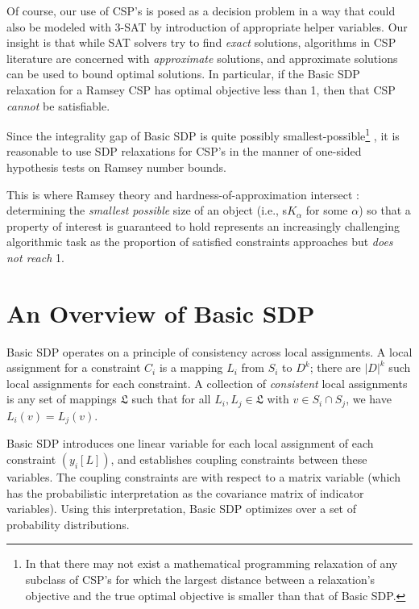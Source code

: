 \documentclass[12pt]{article} %
\begin{document}
Of course, our use of CSP's is posed as a decision problem in a way that could also be modeled with 3-SAT by introduction of appropriate helper variables. Our insight is that while SAT solvers try to find \textit{exact} solutions, algorithms in CSP literature are concerned with \textit{approximate} solutions, and approximate solutions can be used to bound optimal solutions. In particular, if the Basic SDP relaxation for a Ramsey CSP has optimal objective less than 1, then that CSP \textit{cannot} be satisfiable. 

Since the integrality gap of Basic SDP is quite possibly smallest-possible\footnote{In that there may not exist a mathematical programming relaxation of any subclass of CSP's for which the largest distance between a relaxation's objective and the true optimal objective is smaller than that of Basic SDP.} \cite{raghavendra2008optimal}, it is reasonable to use SDP relaxations for CSP's in the manner of one-sided hypothesis tests on Ramsey number bounds. 

This is where Ramsey theory and hardness-of-approximation intersect : determining the \textit{smallest possible} size of an object (i.e., s$K_{\alpha}$ for some $\alpha$) so that a property of interest is guaranteed to hold represents an increasingly challenging algorithmic task as the proportion of satisfied constraints approaches but \textit{does not reach} 1. 

\section{An Overview of Basic SDP}

Basic SDP operates on a principle of consistency across local assignments. A local assignment for a constraint $C_i$ is a mapping $L_i$ from $S_i$ to $D^{k}$; there are $|D|^k$ such local assignments for each constraint. A collection of \textit{consistent} local assignments is any set of mappings $\mathfrak{L}$ such that for all $L_i, L_j \in \mathfrak{L}$ with $v \in S_i \cap S_j$, we have $L_i(v) = L_j(v)$.

Basic SDP introduces one linear variable for each local assignment of each constraint $(y_i[L])$, and establishes coupling constraints between these variables. The coupling constraints are with respect to a matrix variable (which has the probabilistic interpretation as the covariance matrix of indicator variables). Using this interpretation, Basic SDP optimizes over a set of probability distributions.
\end{document}
